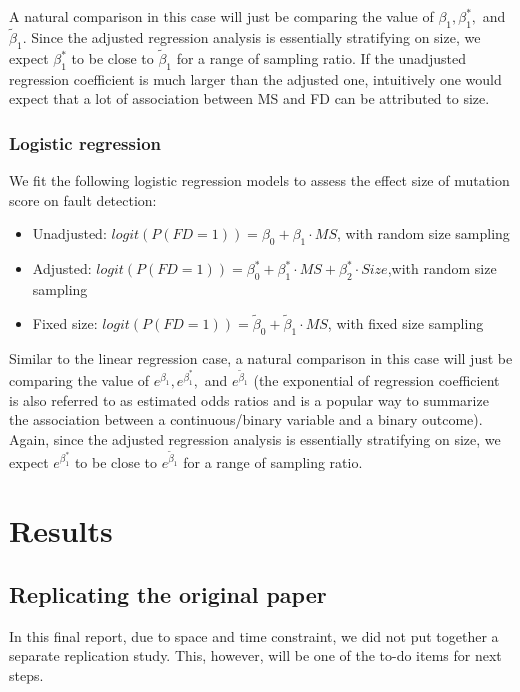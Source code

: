 \documentclass[10pt,letterpaper]{article}
\begin{document}
A natural comparison in this case will just be comparing the value of $\beta_1,\beta^*_1,$ and $\tilde{\beta}_1$. Since the adjusted regression analysis is essentially stratifying on size, we expect $\beta^*_1$ to be close to $\tilde{\beta}_1$ for a range of sampling ratio. If the unadjusted regression coefficient is much larger than the adjusted one, intuitively one would expect that a lot of association between MS and FD can be attributed to size. 

\subsubsection{Logistic regression}


We fit the following logistic regression models to assess the effect size of mutation score on fault detection:

\begin{itemize}
    \item 
    Unadjusted:  $logit(P(FD=1)) = \beta_0 + \beta_1 \cdot MS$, with random size sampling
    \item
     Adjusted:   $logit(P(FD=1)) = \beta^*_0 + \beta^*_1 \cdot MS + \beta^*_2 \cdot Size$,with random size sampling
     \item
     Fixed size: $logit(P(FD=1)) = \tilde{\beta}_0 + \tilde{\beta}_1 \cdot MS$, with fixed size sampling
\end{itemize}

Similar to the linear regression case, a natural comparison in this case will just be comparing the value of $e^{\beta_1},e^{\beta^*_1},$ and $e^{\tilde{\beta}_1}$ (the exponential of regression coefficient is also referred to as estimated odds ratios and is a popular way to summarize the association between a continuous/binary variable and a binary outcome).  Again, since the adjusted regression analysis is essentially stratifying on size, we expect $e^{\beta^*_1}$ to be close to $e^{\tilde{\beta}_1}$ for a range of sampling ratio.  



\section{Results}

\subsection{Replicating the original paper}

In this final report, due to space and time constraint, we did not put together a separate replication study. This, however, will be one of the to-do items for next steps. 
\end{document}
